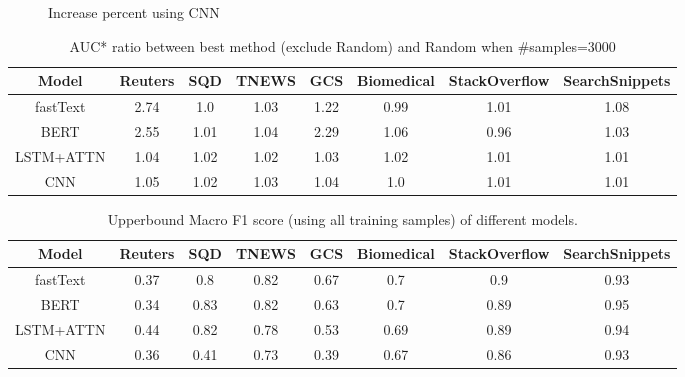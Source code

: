 \begin{figure}[th!]
\begin{center}
	\end{center}
	\noindent
	\begin{center}
	\end{center}
	\caption{Increase percent using CNN}
	\label{fig:auc_increase_cnn}
\end{figure}

\begin{table}[th]
	\scriptsize
	\centering
	\begin{tabular}{cccccccc}
		\toprule
		Model & Reuters    & SQD   & TNEWS   & GCS& Biomedical & StackOverflow & SearchSnippets\\ \hline
		fastText & 2.74 & 1.0 & 1.03 & 1.22 & 0.99 & 1.01 & 1.08 \\
		BERT & 2.55 & 1.01 & 1.04 & 2.29 & 1.06 & 0.96 & 1.03 \\
		LSTM+ATTN & 1.04 & 1.02 & 1.02 & 1.03 & 1.02 & 1.01 & 1.01 \\
		CNN & 1.05 & 1.02 & 1.03 & 1.04 & 1.0 & 1.01 & 1.01 \\
		
		\bottomrule
	\end{tabular}
	\caption{AUC* ratio between best method (exclude Random) and Random when \#samples=3000}
	\label{table:auc_ratio}
\end{table}

\begin{table}[th]
	\scriptsize
	\centering
	\begin{tabular}{cccccccc}
		\toprule
		Model & Reuters    & SQD   & TNEWS   & GCS& Biomedical & StackOverflow & SearchSnippets\\ \hline
		fastText & 0.37 & 0.8 & 0.82 & 0.67 & 0.7 & 0.9 & 0.93\\
		BERT & 0.34 & 0.83 & 0.82 & 0.63 & 0.7 & 0.89 & 0.95\\
		LSTM+ATTN & 0.44 & 0.82 & 0.78 & 0.53 & 0.69 & 0.89 & 0.94\\
		CNN & 0.36 & 0.41 & 0.73 & 0.39 & 0.67 & 0.86 & 0.93\\
		\bottomrule
	\end{tabular}
	\caption{Upperbound Macro F1 score (using all training samples) of different models.}
	\label{table:upperbound}
\end{table}


